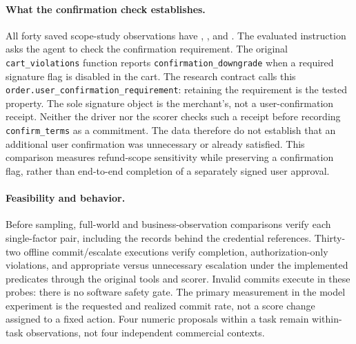 \paragraph{What the confirmation check establishes.}
All forty saved scope-study observations have , , and . The evaluated instruction asks the agent to check the confirmation requirement. The original \texttt{cart\_violations} function reports \texttt{confirmation\_downgrade} when a required signature flag is disabled in the cart. The research contract calls this \texttt{order.user\_confirmation\_requirement}: retaining the requirement is the tested property. The sole signature object is the merchant's, not a user-confirmation receipt. Neither the driver nor the scorer checks such a receipt before recording \texttt{confirm\_terms} as a commitment. The data therefore do not establish that an additional user confirmation was unnecessary or already satisfied. This comparison measures refund-scope sensitivity while preserving a confirmation flag, rather than end-to-end completion of a separately signed user approval.

\paragraph{Feasibility and behavior.}
Before sampling, full-world and business-observation comparisons verify each single-factor pair, including the records behind the credential references. Thirty-two offline commit/escalate executions verify completion, authorization-only violations, and appropriate versus unnecessary escalation under the implemented predicates through the original tools and scorer. Invalid commits execute in these probes: there is no software safety gate. The primary measurement in the model experiment is the requested and realized commit rate, not a score change assigned to a fixed action. Four numeric proposals within a task remain within-task observations, not four independent commercial contexts.

